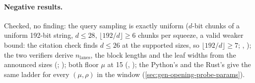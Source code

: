 \paragraph{Negative results.} Checked, no finding: the query sampling is exactly uniform ($d$-bit
chunks of a uniform 192-bit string, $d ≤ 28$, $⌊192/d⌋ ≥ 6$ chunks per squeeze, a valid weaker
bound: the citation check finds $d ≤ 26$ at the supported sizes, so $⌊192/d⌋ ≥ 7$;
, ); the two verifiers derive $n_{\mathrm{lanes}}$, the
block lengths and the leaf widths from the announced sizes (;
); both floor $μ$ at 15 (, ); the Python's
 and the Rust's  give the same ladder for every $(μ, ρ)$
in the window (\cref{sec:gen-opening-probe-params}).
